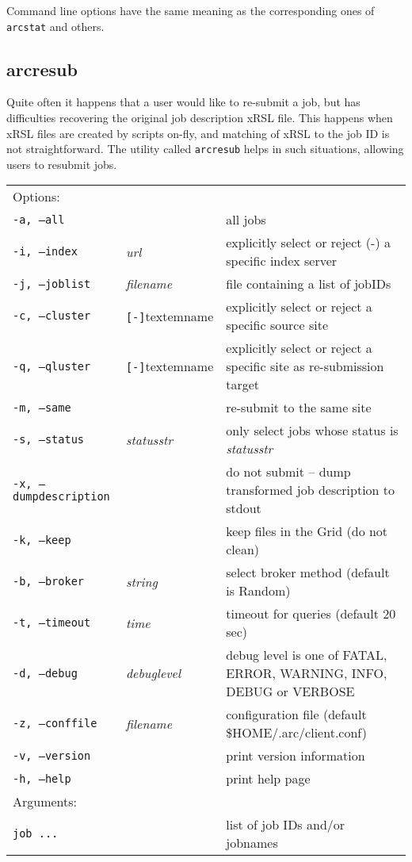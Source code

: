 Command line options have the same meaning as the corresponding ones of \verb#arcstat# and others.


\subsection{arcresub}
\label{sec:arcresub}

Quite often it happens that a user would like to re-submit a job, but
has difficulties recovering the original job description xRSL file.
This happens when xRSL files are created by scripts on-fly, and
matching of xRSL to the job ID is not straightforward. The utility
called \texttt{arcresub} helps
in such situations, allowing users to resubmit jobs.

\hspace*{0.5cm}
\begin{shaded}
\end{shaded}
\begin{longtable}{llp{8cm}}
   Options:&&\\
   \texttt{-a, --all}& & all jobs\\
   \texttt{-i, --index}&\textit{url}&explicitly select or reject (-) a specific index server\\
   \texttt{-j, --joblist}& \textit{filename} & file containing a list of jobIDs\\
   \texttt{-c, --cluster}&\verb#[-]#textem{name}&explicitly select or reject a specific source site\\
   \texttt{-q, --qluster}&\verb#[-]#textem{name}&explicitly select or reject a specific site as re-submission target\\
   \texttt{-m, --same}& &re-submit to the same site\\
   \texttt{-s, --status}& \textit{statusstr} &only select jobs whose status is \textit{statusstr}\\
   \texttt{-x, --dumpdescription}&&do not submit -- dump transformed job description to stdout\\
   \texttt{-k, --keep}& & keep files in the Grid (do not clean)\\
   \texttt{-b, --broker}&\textit{string}&select broker method (default is Random)\\
   \texttt{-t, --timeout}& \textit{time} & timeout for queries (default 20 sec)\\
   \texttt{-d, --debug}& \textit{debuglevel}&debug level is one of  FATAL, ERROR, WARNING, INFO, DEBUG or VERBOSE\\
   \texttt{-z, --conffile}&\textit{filename}& configuration file (default {\$}HOME/.arc/client.conf)\\
   \texttt{-v, --version}& & print version information\\
   \texttt{-h, --help}& & print help page\\
   Arguments:&&\\
   \texttt{job ...} && list of job IDs and/or jobnames\\
\end{longtable}

